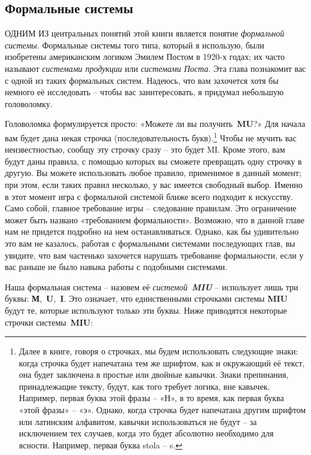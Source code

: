 \documentclass[../main.tex]{subfiles}
\begin{document}

\subsection{Формальные системы}

ОДНИМ ИЗ центральных понятий этой книги является понятие \emph{формальной системы}. Формальные системы того типа, который я использую, были изобретены американским логиком Эмилем Постом в 1920-х годах; их часто называют \emph{системами продукции} или \emph{системами Поста}. Эта глава познакомит вас с одной из таких формальных систем. Надеюсь, что вам захочется хотя бы немного её исследовать \--- чтобы вас заинтересовать, я придумал небольшую головоломку.

Головоломка формулируется просто: «Можете ли вы получить~\textbf{MU}?» Для начала вам будет дана некая строчка (последовательность букв).\footnote{Далее в книге, говоря о строчках, мы будем использовать следующие знаки: когда строчка будет напечатана тем же шрифтом, как и окружающий её текст, она будет заключена в простые или двойные кавычки. Знаки препинания, принадлежащие тексту, будут, как того требует логика, вне кавычек. Например, первая буква этой фразы \--- «Н», в то время, как первая буква «этой фразы» \--- «э». Однако, когда строчка будет напечатана другим шрифтом или латинским алфавитом, кавычки использоваться не будут \--- за исключением тех случаев, когда это будет абсолютно необходимо для ясности. Например, первая буква stola \--- s.} Чтобы не мучить вас неизвестностью, сообщу эту строчку сразу \--- это будет MI. Кроме этого, вам будут даны правила, с помощью которых вы сможете превращать одну строчку в другую. Вы можете использовать любое правило, применимое в данный момент; при этом, если таких правил несколько, у вас имеется свободный выбор. Именно в этот момент игра с формальной системой ближе всего подходит к искусству. Само собой, главное требование игры \--- следование правилам. Это ограничение может быть названо «требованием формальности». Возможно, что в данной главе нам не придется подробно на нем останавливаться. Однако, как бы удивительно это вам не казалось, работая с формальными системами последующих глав, вы увидите, что вам частенько захочется нарушать требование формальности, если у вас раньше не было навыка работы с подобными системами.

Наша формальная система \--- назовем её \emph{системой~\textbf{MIU}} \--- использует лишь три буквы: \textbf{М},~\textbf{U},~\textbf{I}. Это означает, что единственными строчками системы \textbf{MIU} будут те, которые используют только эти буквы. Ниже приводятся некоторые строчки системы~\textbf{MIU}:
\end{document}
